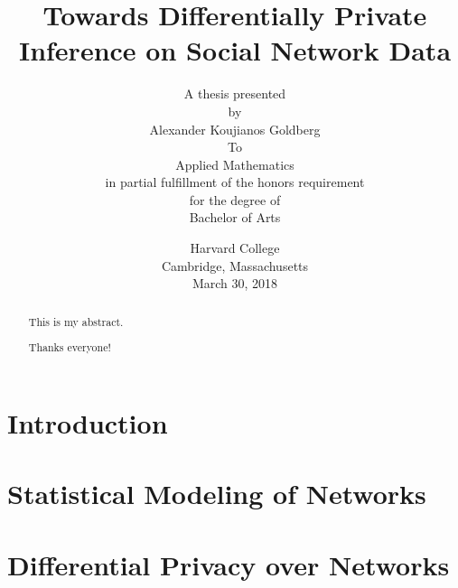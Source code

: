 \documentclass[12pt]{report}
\title{
	\textbf{Towards Differentially Private Inference on Social Network Data} \\[1.5em]
	}
\author{ 
				A thesis presented  \\[0.1em]
				by\\[1.25em]
				\Large{Alexander Koujianos Goldberg} \\[1.25em]
				To\\[0.1em]
				Applied Mathematics\\[0.1em]
				in partial fulfillment of the honors requirement\\[0.1em]
				for the degree of\\[0.1em]
				Bachelor of Arts
			}
\date{Harvard College\\[0.1em]
	Cambridge, Massachusetts\\[0.1em]
	March 30, 2018}
\begin{document}
	
	\maketitle 
	
	\begin{abstract}
		This is my abstract.
	\end{abstract}

	\renewcommand\abstractname{Acknowledgements}
	\begin{abstract}
		Thanks everyone!
	\end{abstract}
	
	\tableofcontents
	
	\chapter{Introduction}\label{ch:intro}
	
	
	
	\chapter[Statistical Modeling of Networks]{Statistical Modeling of Networks}
	\label{ch:network_modeling}
	
	
	
	\chapter{Differential Privacy over Networks}\label{ch:dp_defns}
	
	
	
	
\end{document}
